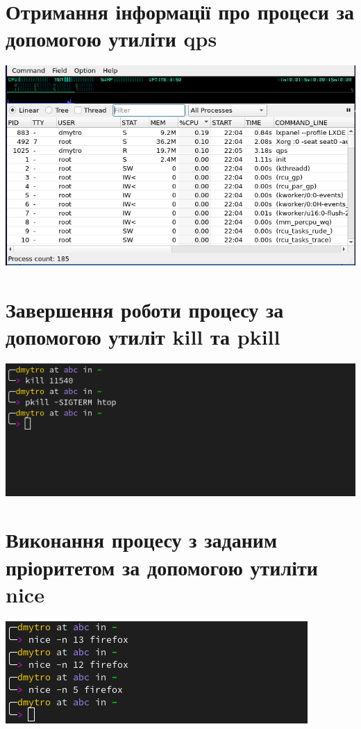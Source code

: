 \documentclass{article}
\begin{document}
\begin{normalsize}
	\section*{Отримання інформації про процеси за допомогою утиліти qps}
	\begin{center}
		\includegraphics[scale=0.5]{qps1}
	\end{center}
	\section*{Завершення роботи процесу за допомогою утиліт kill та pkill}
	\begin{center}
		\includegraphics[scale=0.5]{kill}
	\end{center}
	\section*{Виконання процесу з заданим пріоритетом за допомогою утиліти nice}
	\begin{center}
		\includegraphics[scale=0.5]{nice}
	\end{center}

\end{normalsize}
\end{document}
